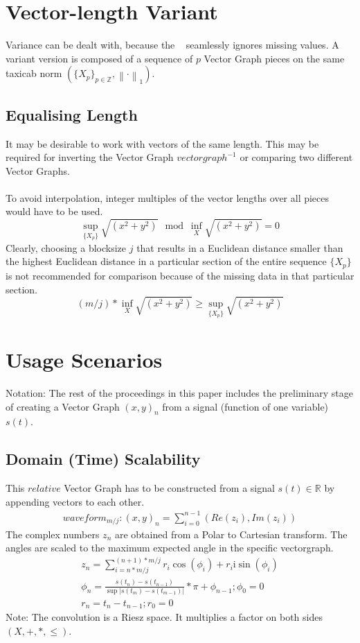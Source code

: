 \documentclass{report}
\newcommand\norm[1]{\left\lVert#1\right\rVert}
\begin{document}
\chapter{Vector-length Variant}
Variance can be dealt with, because the ~\cite[Stopeight\_Analyzer.tex]{Analyzer} seamlessly ignores missing values. A variant version is composed of a sequence of $p$ Vector Graph pieces on the same taxicab norm $(\{X_{p}\}_{p\in \mathbb{Z}},\norm{\cdot}_1)$.
\section{Equalising Length}
It may be desirable to work with vectors of the same length. This may be required for inverting the Vector Graph $vectorgraph^{-1}$ or comparing two different Vector Graphs.\\\\
To avoid interpolation, integer multiples of the vector lengths over all pieces would have to be used.
\begin{equation}
\sup \limits _{\{X_{p}\}} \sqrt{(x^2+y^2)} \mod \inf \limits _{X} \sqrt{(x^2+y^2)} = 0
\end{equation}
Clearly, choosing a blocksize $j$ that results in a Euclidean distance smaller than the highest Euclidean distance in a particular section of the entire sequence $\{X_{p}\}$ is not recommended for comparison because of the missing data in that particular section.
\begin{equation}
(m/j)*\inf \limits _{X} \sqrt{(x^2+y^2)} \geq \sup \limits _{\{X_{p}\}} \sqrt{(x^2+y^2)}\label{eq:4}
\end{equation}

\chapter{Usage Scenarios}
Notation: The rest of the proceedings in this paper includes the preliminary stage of creating a Vector Graph $(x,y)_{n}$ from a signal (function of one variable) $s(t)$.
\section{Domain (Time) Scalability}
This $relative$ Vector Graph has to be constructed from a signal $s(t)\in \mathbb{R}$ by appending vectors to each other.
\begin{align}
waveform_{m/j}: (x,y)_{n}=\sum \limits _{i=0}^{n-1}(Re(z_{i}),Im(z_{i}))
\end{align}
The complex numbers $z_{n}$ are obtained from a Polar to Cartesian transform. The angles are scaled to the maximum expected angle in the specific vectorgraph.
\begin{align}
z_{n}=\sum \limits _{i=n*m/j}^{(n+1)*m/j}r_{i}\cos(\phi_{i})+r_{i}\mathrm{i}\sin(\phi_{i})\\
\phi_{n}=\frac{s(t_{n})-s(t_{n-1})}{\sup \lvert s(t_{m})-s(t_{m-1}) \rvert}*\pi+\phi_{n-1};\phi_{0}=0\\
r_{n}=t_{n}-t_{n-1};r_{0}=0
\end{align}
Note: The convolution is a Riesz space. It multiplies a factor on both sides $(X,+,*,\leq)$.
\end{document}

